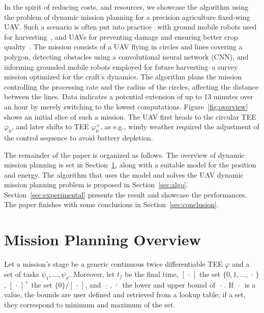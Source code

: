 \documentclass[letterpaper,10pt,conference]{ieeeconf}
\theoremstyle{definition}
\begin{document}
In the spirit of reducing costs, and resources, we showcase the algorithm using the problem of dynamic mission planning for a precision agriculture fixed-wing UAV. Such a scenario is often put into practice~\cite{hajjaj2014review} with ground mobile robots used for harvesting~\cite{qingchun2012study,dong2011development, de2011design, aljanobi2010setup, li2008analysis, edan2000robotic}, and UAVs for preventing damage and ensuring better crop quality~\cite{puri2017agriculture, daponte2019review}. The mission consists of a UAV flying in circles and lines covering a polygon, detecting obstacles using a convolutional neural network (CNN), and informing grounded mobile robots employed for future harvesting--a survey mission optimized for the craft's dynamics. The algorithm plans the mission controlling the processing rate and the radius of the circles, affecting the distance between the lines. Data indicates a potential extension of up to 13 minutes over an hour by merely switching to the lowest computations. Figure~\ref{fig:overview} shows an initial slice of such a mission. The UAV first heads to the circular TEE $\varphi_0$, and later shifts to TEE $\varphi_0^+$, as e.g., windy weather required the adjustment of the control sequence to avoid battery depletion.

The remainder of the paper is organized as follows. The overview of dynamic mission planning is set in Section~\ref{sec:prob}, along with a suitable model for the position and energy. The algorithm that uses the model and solves the UAV dynamic mission planning problem is proposed in Section~\ref{sec:algo}. Section~\ref{sec:experimental} presents the result and showcase the performances. The paper finishes with some conclusions in Section~\ref{sec:conclusion}.


\section{Mission Planning Overview}
\label{sec:prob}

Let a mission's stage be a generic continuous twice differentiable TEE $\varphi$ and a set of tasks $\psi_1,\dots,\psi_{\sigma}$. Moreover, let $t_f$ be the final time, $[\,\cdot\,]$ the set $\{0,1,\dots,\,\cdot\,\}$, $[\,\cdot\,]^+$ the set $\{0\}/[\,\cdot\,]$, and $\underline{\,\cdot\,},\overline{\,\cdot\,}$ the lower and upper bound of $\,\cdot\,$. If $\,\cdot\,$ is a value, the bounds are user defined and retrieved from a lookup table; if a set, they correspond to minimum and maximum of the set.
\end{document}
